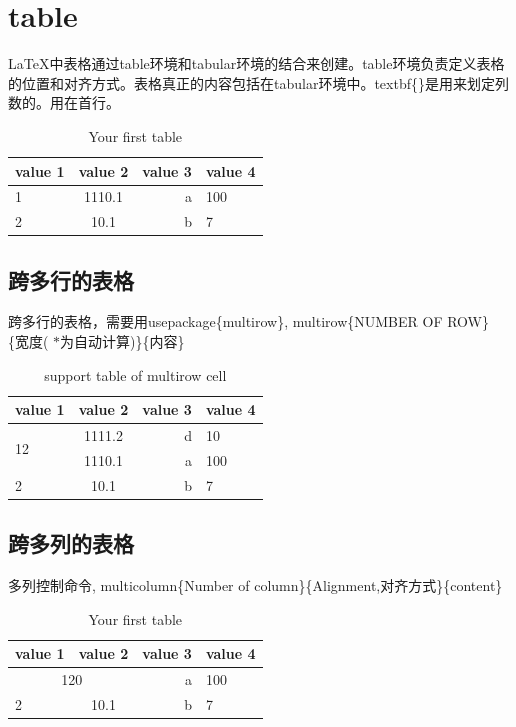 \section{table}
LaTeX中表格通过table环境和tabular环境的结合来创建。table环境负责定义表格的位置和对齐方式。表格真正的内容包括在tabular环境中。textbf\{\}是用来划定列数的。用在首行。
\begin{table}[h!]
	\begin{center}
		\caption{Your first table} %
		\label{tab:table1}
		\begin{tabular}{l|c|r|l}
			\textbf{value 1} & \textbf{value 2} & \textbf{value 3} & \textbf{value 4}\\
			\hline
			1 & 1110.1 & a & 100 \\
			\hline
			2 & 10.1    & b  & 7
		\end{tabular}
	\end{center}
\end{table}
\subsection{跨多行的表格}
跨多行的表格，需要用usepackage\{multirow\},  multirow\{NUMBER OF ROW\} \{宽度( $\ast$为自动计算)\}\{内容\}
\begin{table}[h!]
	\begin{center}
		\caption{support table of multirow cell } %
		\label{tab:table2}
		\begin{tabular}{l|c|r|l} %
			\textbf{value 1} & \textbf{value 2} & \textbf{value 3} & \textbf{value 4}\\
			\hline
			\multirow{2}{*}{12} &1111.2 & d & 10\\
			                                     & 1110.1 & a & 100 \\
			\hline
			2 & 10.1    & b  & 7
		\end{tabular}
	\end{center}
\end{table}
\subsection{跨多列的表格}
多列控制命令, multicolumn\{Number of column\}\{Alignment,对齐方式\}\{content\}
\begin{table}[h!]
	\begin{center}
		\caption{Your first table} %
		\label{tab:table3}
		\begin{tabular}{l|c|r|l}
			\textbf{value 1} & \textbf{value 2} & \textbf{value 3} & \textbf{value 4}\\
			\hline
		      \multicolumn{2}{c|}{120}  & a & 100 \\
			\hline
			2 & 10.1    & b  & 7
		\end{tabular}
	\end{center}
\end{table}
